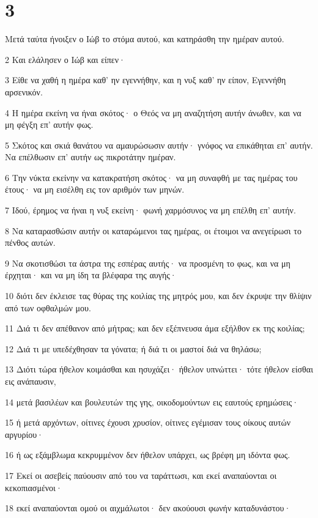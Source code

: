 \chapter{3}

\par Μετά ταύτα ήνοιξεν ο Ιώβ το στόμα αυτού, και κατηράσθη την ημέραν αυτού.
\par 2 Και ελάλησεν ο Ιώβ και είπεν·
\par 3 Είθε να χαθή η ημέρα καθ' ην εγεννήθην, και η νυξ καθ' ην είπον, Εγεννήθη αρσενικόν.
\par 4 Η ημέρα εκείνη να ήναι σκότος· ο Θεός να μη αναζητήση αυτήν άνωθεν, και να μη φέγξη επ' αυτήν φως.
\par 5 Σκότος και σκιά θανάτου να αμαυρώσωσιν αυτήν· γνόφος να επικάθηται επ' αυτήν. Να επέλθωσιν επ' αυτήν ως πικροτάτην ημέραν.
\par 6 Την νύκτα εκείνην να κατακρατήση σκότος· να μη συναφθή με τας ημέρας του έτους· να μη εισέλθη εις τον αριθμόν των μηνών.
\par 7 Ιδού, έρημος να ήναι η νυξ εκείνη· φωνή χαρμόσυνος να μη επέλθη επ' αυτήν.
\par 8 Να καταρασθώσιν αυτήν οι καταρώμενοι τας ημέρας, οι έτοιμοι να ανεγείρωσι το πένθος αυτών.
\par 9 Να σκοτισθώσι τα άστρα της εσπέρας αυτής· να προσμένη το φως, και να μη έρχηται· και να μη ίδη τα βλέφαρα της αυγής·
\par 10 διότι δεν έκλεισε τας θύρας της κοιλίας της μητρός μου, και δεν έκρυψε την θλίψιν από των οφθαλμών μου.
\par 11 Διά τι δεν απέθανον από μήτρας; και δεν εξέπνευσα άμα εξήλθον εκ της κοιλίας;
\par 12 Διά τι με υπεδέχθησαν τα γόνατα; ή διά τι οι μαστοί διά να θηλάσω;
\par 13 Διότι τώρα ήθελον κοιμάσθαι και ησυχάζει· ήθελον υπνώττει· τότε ήθελον είσθαι εις ανάπαυσιν,
\par 14 μετά βασιλέων και βουλευτών της γης, οικοδομούντων εις εαυτούς ερημώσεις·
\par 15 ή μετά αρχόντων, οίτινες έχουσι χρυσίον, οίτινες εγέμισαν τους οίκους αυτών αργυρίου·
\par 16 ή ως εξάμβλωμα κεκρυμμένον δεν ήθελον υπάρχει, ως βρέφη μη ιδόντα φως.
\par 17 Εκεί οι ασεβείς παύουσιν από του να ταράττωσι, και εκεί αναπαύονται οι κεκοπιασμένοι·
\par 18 εκεί αναπαύονται ομού οι αιχμάλωτοι· δεν ακούουσι φωνήν καταδυνάστου·
